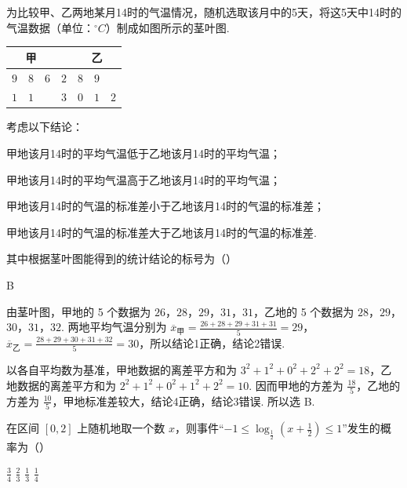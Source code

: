 \begin{problem}
为比较甲、乙两地某月14时的气温情况，随机选取该月中的5天，将这5天中14时的气温数据（单位：\(^{\circ}C\)）制成如图所示的茎叶图.

\begin{center}
\begin{tabular}{rrr|c|lll}
\multicolumn{3}{c|}{甲} & & \multicolumn{3}{c}{乙} \\
\hline
\(9\) & \(8\) & \(6\) & \(2\) & \(8\) & \(9\) & \\
\(1\) & \(1\) &        & \(3\) & \(0\) & \(1\) & \(2\)
\end{tabular}
\end{center}

考虑以下结论：

\begin{circlelist}
\item 甲地该月14时的平均气温低于乙地该月14时的平均气温；
\item 甲地该月14时的平均气温高于乙地该月14时的平均气温；
\item 甲地该月14时的气温的标准差小于乙地该月14时的气温的标准差；
\item 甲地该月14时的气温的标准差大于乙地该月14时的气温的标准差.
\end{circlelist}

其中根据茎叶图能得到的统计结论的标号为（\quad）

\choices
    {}
    {}
    {}
    {}
\end{problem}

\begin{answer}
B
\end{answer}

\begin{solution}
由茎叶图，甲地的 5 个数据为 \(26\)，\(28\)，\(29\)，\(31\)，\(31\)，乙地的 5 个数据为 \(28\)，\(29\)，\(30\)，\(31\)，\(32\). 两地平均气温分别为
\(\overline{x}_{\text{甲}}=\frac{26+28+29+31+31}{5}=29\)，
\(\overline{x}_{\text{乙}}=\frac{28+29+30+31+32}{5}=30\)，所以结论1正确，结论2错误.

以各自平均数为基准，甲地数据的离差平方和为 \(3^2+1^2+0^2+2^2+2^2=18\)，乙地数据的离差平方和为 \(2^2+1^2+0^2+1^2+2^2=10\). 因而甲地的方差为 \(\frac{18}{5}\)，乙地的方差为 \(\frac{10}{5}\)，甲地标准差较大，结论4正确，结论3错误. 所以选 B.
\end{solution}

\begin{problem}
在区间 \([0,2]\) 上随机地取一个数 \(x\)，则事件“\(-1 \leqslant \log_{\frac{1}{2}}\left(x + \frac{1}{2}\right) \leqslant 1\)”发生的概率为（\quad）

\choices
    {\( \frac{3}{4} \)}
    {\( \frac{2}{3} \)}
    {\( \frac{1}{3} \)}
    {\( \frac{1}{4} \)}
\end{problem}

